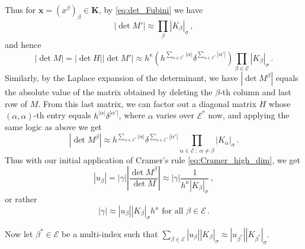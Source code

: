 \documentclass{amsart}%
\theoremstyle{plain}
\numberwithin{equation}{section}
\begin{document}
Thus for $\mathbf{x} = (x^{\beta})_{\beta} \in \mathbf{K}$, by \eqref{eq:det_Fubini} we have
\[
	\left | \det M' \right | \approx \prod\limits_{\beta} \left | K_{\beta} \right |_{\sigma} \, ,
\]
and hence
\[
	\left | \det M \right | = \left | \det H \right | \left |  \det M' \right | \approx h ^{\kappa} \left ( h^{\sum\limits_{\alpha \in \mathcal{E}^*} |\alpha|} \delta ^{\sum\limits_{\alpha \in \mathcal{E}^*} |\alpha'|} \right ) \prod\limits_{\beta \in \mathcal{E}} \left | K_{\beta } \right |_{\sigma} \, . 
\]
Similarly, by the Laplace expansion of the determinant, we have $\left | \det M^{\beta} \right |$ equals the absolute value of the matrix obtained by deleting the $\beta$-th column and last row of $M$. From this last matrix, we can factor out a diagonal matrix $H$ whose $(\alpha, \alpha)$-th entry equals $h^{|\alpha|} \delta^{|\alpha'|}$, where $\alpha$ varies over $\mathcal{E}^*$ now, and applying the same logic as above we get
\[
	\left | \det M^{\beta} \right | \approx h ^{\sum\limits_{\alpha \in \mathcal{E}^*} |\alpha|} \delta ^{\sum\limits_{\alpha \in \mathcal{E}^*} |\alpha'|} \prod\limits_{\alpha \in \mathcal{E} ~:~ \alpha \neq \beta } \left | K_{\alpha} \right |_{\sigma} \, .
\]
Thus with our initial application of Cramer's rule \eqref{eq:Cramer_high_dim}, we get
\[
	\left | u_{\beta} \right | = \left | \gamma \right | \left | \frac{\det M^{\beta}}{\det M} \right | \approx \left | \gamma \right | \frac{1}{h^{\kappa} \left | K_{\beta}\right |_{\sigma}} \, ,
\]
or rather
\begin{equation}\label{eq:gamma_many_beta}
	\left | \gamma \right | \approx \left | u_{\beta} \right | \left | K_{\beta} \right |_{\sigma} h^{\kappa}  \text{ for all } \beta \in \mathcal{E} \, .
\end{equation}

Now let $\beta^* \in \mathcal{E}$ be a multi-index such that $\sum\limits_{\beta \in \mathcal{E} } \left | u_{\beta} \right | \left | K_{\beta} \right |_{\sigma} \approx \left | u_{\beta^*} \right | \left | K_{\beta^*} \right |_{\sigma}$.
\end{document}
